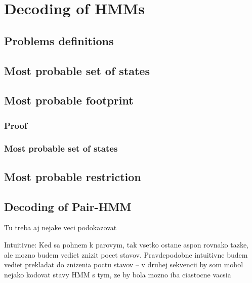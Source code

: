 \chapter{Decoding of HMMs}

\section{Problems definitions}

\section{Most probable set of states}

\section{Most probable footprint}

\subsection{Proof}

\subsection{Most probable set of states}

\section{Most probable restriction}

\section{Decoding of Pair-HMM}
Tu treba aj nejake veci podokazovat

Intuitivne: Ked sa pohnem k parovym, tak vsetko ostane aspon rovnako tazke, ale mozno budem vediet znizit pocet stavov.
Pravdepodobne intuitivne budem vediet prekladat do znizenia poctu stavov -- v druhej sekvencii by som mohol nejako kodovat stavy HMM s tym, ze by bola mozno iba ciastocne vacsia
